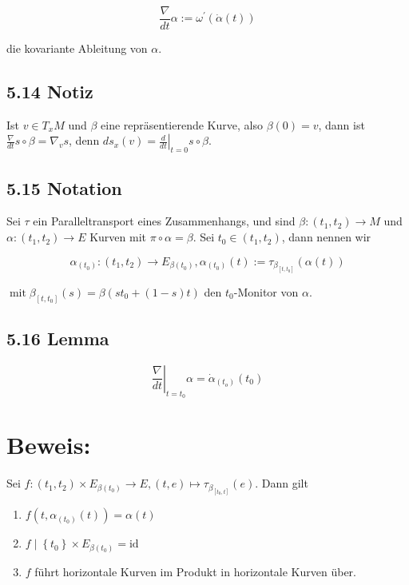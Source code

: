 $$
\frac{\nabla}{d t} \alpha:=\omega^{\prime}(\dot{\alpha}(t))
$$

die kovariante Ableitung von $\alpha$.

\subsection*{5.14 Notiz}
Ist $v \in T_{x} M$ und $\beta$ eine repräsentierende Kurve, also $\beta(0)=v$, dann ist $\frac{\nabla}{d t} s \circ \beta=\nabla_{v} s$, denn $d s_{x}(v)=\left.\frac{d}{d t}\right|_{t=0} s \circ \beta$.

\subsection*{5.15 Notation}
Sei $\tau$ ein Paralleltransport eines Zusammenhangs, und sind $\beta:\left(t_{1}, t_{2}\right) \rightarrow M$ und $\alpha:\left(t_{1}, t_{2}\right) \rightarrow E$ Kurven mit $\pi \circ \alpha=\beta$. Sei $t_{0} \in\left(t_{1}, t_{2}\right)$, dann nennen wir

$$
\alpha_{\left(t_{0}\right)}:\left(t_{1}, t_{2}\right) \rightarrow E_{\beta\left(t_{0}\right)}, \alpha_{\left(t_{0}\right)}(t):=\tau_{\beta_{\left[t, t_{0}\right]}}(\alpha(t))
$$

$\operatorname{mit} \beta_{\left[t, t_{0}\right]}(s)=\beta\left(s t_{0}+(1-s) t\right)$ den $t_{0}$-Monitor von $\alpha$.

\subsection*{5.16 Lemma}
$$
\left.\frac{\nabla}{d t}\right|_{t=t_{0}} \alpha=\dot{\alpha}_{\left(t_{o}\right)}\left(t_{0}\right)
$$

\section*{Beweis:}
Sei $f:\left(t_{1}, t_{2}\right) \times E_{\beta\left(t_{0}\right)} \rightarrow E,(t, e) \mapsto \tau_{\beta_{\left[t_{0}, t\right]}}(e)$. Dann gilt

\begin{enumerate}
  \item $f\left(t, \alpha_{\left(t_{0}\right)}(t)\right)=\alpha(t)$
  \item $f \mid\left\{t_{0}\right\} \times E_{\beta\left(t_{0}\right)}=\mathrm{id}$
  \item $f$ führt horizontale Kurven im Produkt in horizontale Kurven über.
\end{enumerate}

